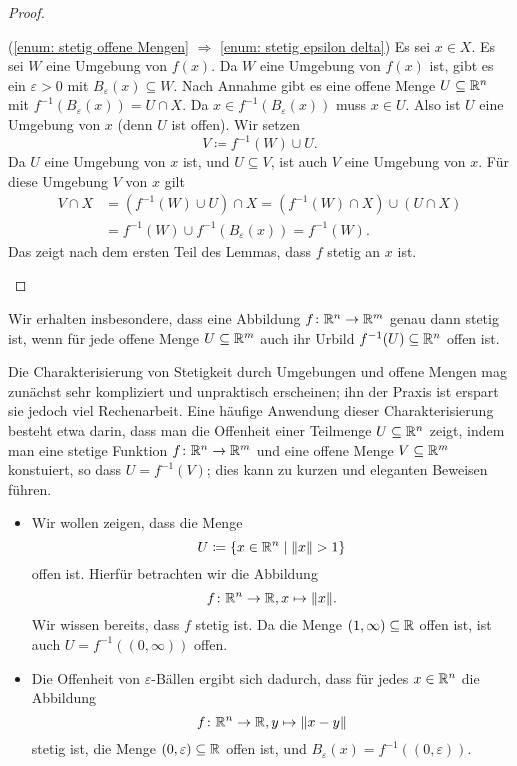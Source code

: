 \documentclass[a4paper,10pt]{article}
\begin{document}
\begin{proof}
\begin{enumerate}
   (\ref{enum: stetig offene Mengen} $\Rightarrow$ \ref{enum: stetig epsilon delta}) Es sei $x \in X$. Es sei $W$ eine Umgebung von $f(x)$. Da $W$ eine Umgebung von $f(x)$ ist, gibt es ein $\varepsilon > 0$ mit $B_\varepsilon(x) \subseteq W$. Nach Annahme gibt es eine offene Menge $U \subseteq \mathbb{R}^n$ mit $f^{-1}(B_\varepsilon(x)) = U \cap X$. Da $x \in f^{-1}(B_\varepsilon(x))$ muss $x \in U$. Also ist $U$ eine Umgebung von $x$ (denn $U$ ist offen). Wir setzen
   \[
    V \coloneqq f^{-1}(W) \cup U.
   \]
   Da $U$ eine Umgebung von $x$ ist, und $U \subseteq V$, ist auch $V$ eine Umgebung von $x$. Für diese Umgebung $V$ von $x$ gilt
   \begin{align*}
    V \cap X
    &= (f^{-1}(W) \cup U) \cap X
    = (f^{-1}(W) \cap X) \cup (U \cap X) \\
    &= f^{-1}(W) \cup f^{-1}(B_\varepsilon(x))
    = f^{-1}(W).
   \end{align*}
   Das zeigt nach dem ersten Teil des Lemmas, dass $f$ stetig an $x$ ist.
  \qedhere
 \end{enumerate}
\end{proof}


\begin{bem}
 Wir erhalten insbesondere, dass eine Abbildung $f \colon \mathbb{R}^n \to \mathbb{R}^m$ genau dann stetig ist, wenn für jede offene Menge $U \subseteq \mathbb{R}^m$ auch ihr Urbild $f^{-1}(U) \subseteq \mathbb{R}^n$ offen ist.
\end{bem}


Die Charakterisierung von Stetigkeit durch Umgebungen und offene Mengen mag zunächst sehr kompliziert und unpraktisch erscheinen; ihn der Praxis ist erspart sie jedoch viel Rechenarbeit. Eine häufige Anwendung dieser Charakterisierung besteht etwa darin, dass man die Offenheit einer Teilmenge $U \subseteq \mathbb{R}^n$ zeigt, indem man eine stetige Funktion $f \colon \mathbb{R}^n \to \mathbb{R}^m$ und eine offene Menge $V \subseteq \mathbb{R}^m$ konstuiert, so dass $U = f^{-1}(V)$; dies kann zu kurzen und eleganten Beweisen führen.


\begin{bsp}
 \begin{itemize}
  \item
   Wir wollen zeigen, dass die Menge
   \[
    U \coloneqq \{x \in \mathbb{R}^n \mid \|x\| > 1\}
   \]
   offen ist. Hierfür betrachten wir die Abbildung
   \[
    f \colon \mathbb{R}^n \to \mathbb{R}, x \mapsto \|x\|.
   \]
   Wir wissen bereits, dass $f$ stetig ist. Da die Menge $(1,\infty) \subseteq \mathbb{R}$ offen ist, ist auch $U = f^{-1}((0,\infty))$ offen.
  \item
   Die Offenheit von $\varepsilon$-Bällen ergibt sich dadurch, dass für jedes $x \in \mathbb{R}^n$ die Abbildung
   \[
    f \colon \mathbb{R}^n \to \mathbb{R}, y \mapsto \|x-y\|
   \]
   stetig ist, die Menge $(0,\varepsilon) \subseteq \mathbb{R}$ offen ist, und $B_\varepsilon(x) = f^{-1}((0,\varepsilon))$.
 \end{itemize}
\end{bsp}
\end{document}
